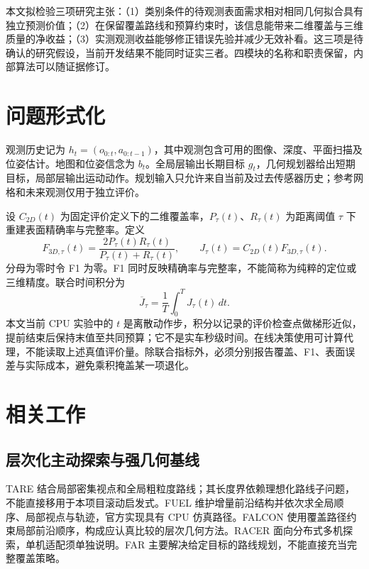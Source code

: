 \documentclass[11pt,a4paper]{article}
\begin{document}
本文拟检验三项研究主张：（1）类别条件的待观测表面需求相对相同几何拟合具有独立预测价值；（2）在保留覆盖路线和预算约束时，该信息能带来二维覆盖与三维质量的净收益；（3）实测观测收益能够修正错误先验并减少无效补看。这三项是待确认的研究假设，当前开发结果不能同时证实三者。四模块的名称和职责保留，内部算法可以随证据修订。

\section{问题形式化}
观测历史记为 $h_t=(o_{0:t},a_{0:t-1})$，其中观测包含可用的图像、深度、平面扫描及位姿估计。地图和位姿信念为 $b_t$。全局层输出长期目标 $g_t$，几何规划器给出短期目标，局部层输出运动动作。规划输入只允许来自当前及过去传感器历史；参考网格和未来观测仅用于独立评价。

设 $C_{2D}(t)$ 为固定评价定义下的二维覆盖率，$P_\tau(t)$、$R_\tau(t)$ 为距离阈值 $\tau$ 下重建表面精确率与完整率。定义
\begin{equation}
 F_{3D,\tau}(t)=\frac{2P_\tau(t)R_\tau(t)}{P_\tau(t)+R_\tau(t)},\qquad
 J_\tau(t)=C_{2D}(t)F_{3D,\tau}(t).
\end{equation}
分母为零时令 F1 为零。F1 同时反映精确率与完整率，不能简称为纯粹的定位或三维精度。联合时间积分为
\begin{equation}
 \overline J_\tau=\frac{1}{T}\int_0^T J_\tau(t)\,dt.
\end{equation}
本文当前 CPU 实验中的 $t$ 是离散动作步，积分以记录的评价检查点做梯形近似，提前结束后保持末值至共同预算；它不是实车秒级时间。在线决策使用可计算代理，不能读取上述真值评价量。除联合指标外，必须分别报告覆盖、F1、表面误差与实际成本，避免乘积掩盖某一项退化。

\section{相关工作}
\subsection{层次化主动探索与强几何基线}
TARE 结合局部密集视点和全局粗粒度路线；其长度界依赖理想化路线子问题，不能直接移用于本项目滚动启发式\cite{cao2021tare,cao2023granularity}。FUEL 维护增量前沿结构并依次求全局顺序、局部视点与轨迹，官方实现具有 CPU 仿真路径\cite{zhou2021fuel}。FALCON 使用覆盖路径约束局部前沿顺序，构成应认真比较的层次几何方法\cite{zhang2025falcon}。RACER 面向分布式多机探索，单机适配须单独说明\cite{zhou2023racer}。FAR 主要解决给定目标的路线规划，不能直接充当完整覆盖策略\cite{yang2022far}。
\end{document}
